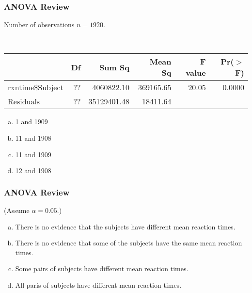 \documentclass[11pt,containsverbatim,handout,xcolor=xelatex,dvipsnames,table]{beamer}
\newcommand{\solnMult}[1]{#1}
\begin{document}
\begin{frame}[fragile]
  \frametitle{ANOVA Review}

Number of observations $n = 1920$.

\hfill \\

{\footnotesize
\begin{tabular}{lrrrrr}
  \hline
 & Df & Sum Sq & Mean Sq & F value & Pr($>$F) \\ 
  \hline
rxntime\$Subject & ?? & 4060822.10 & 369165.65 & 20.05 & 0.0000 \\ 
  Residuals & ?? & 35129401.48 & 18411.64 &  &  \\ 
   \hline
\end{tabular}
}


\begin{enumerate}[(a)]
\item  1 and 1909
\item \solnMult{11 and 1908}
\item 11 and 1909
\item 12 and 1908
\end{enumerate}

\end{frame}


\begin{frame}[fragile]
  \frametitle{ANOVA Review}

  (Assume $\alpha = 0.05$.)

  \begin{enumerate}[(a)]
  \item There is no evidence that the subjects have different mean reaction times.
  \item There is no evidence that some of the subjects have the same mean reaction times.
  \item \solnMult{Some pairs of subjects have different mean reaction times.}
  \item All paris of subjects have different mean reaction times.
  \end{enumerate}

\end{frame}
\end{document}
